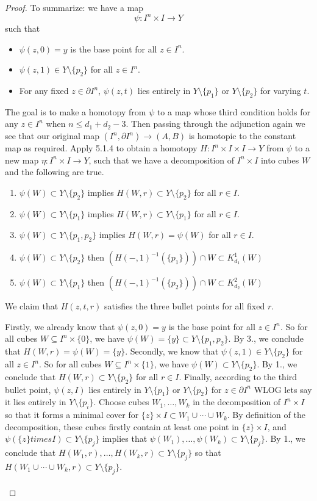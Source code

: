\documentclass[a4paper]{article}
\begin{document}
\begin{prp}{}{}
\begin{proof}
To summarize: we have a map $$\psi:I^n\times I\to Y$$ such that 
\begin{itemize}
\item $\psi(z,0)=y$ is the base point for all $z\in I^n$. 
\item $\psi(z,1)\in Y\setminus\{p_2\}$ for all $z\in I^n$. 
\item For any fixed $z\in\partial I^n$, $\psi(z,t)$ lies entirely in $Y\setminus\{p_1\}$ or $Y\setminus\{p_2\}$ for varying $t$. 
\end{itemize}
The goal is to make a homotopy from $\psi$ to a map whose third condition holds for any $z\in I^n$ when $n\leq d_1+d_2-3$. Then passing through the adjunction again we see that our original map $(I^n,\partial I^n)\to(A,B)$ is homotopic to the constant map as required. Apply 5.1.4 to obtain a homotopy $H:I^n\times I\times I\to Y$ from $\psi$ to a new map $\eta:I^n\times I\to Y$, such that we have a decomposition of $I^n\times I$ into cubes $W$ and the following are true. 
\begin{enumerate}
\item $\psi(W)\subset Y\setminus\{p_2\}$ implies $H(W,r)\subset Y\setminus\{p_2\}$ for all $r\in I$. 
\item $\psi(W)\subset Y\setminus\{p_1\}$ implies $H(W,r)\subset Y\setminus\{p_1\}$ for all $r\in I$. 
\item $\psi(W)\subset Y\setminus\{p_1,p_2\}$ implies $H(W,r)=\psi(W)$ for all $r\in I$. 
\item $\psi(W)\subset Y\setminus\{p_2\}$ then $(H(-,1)^{-1}(\{p_1\}))\cap W\subset K_{d_1}^1(W)$
\item $\psi(W)\subset Y\setminus\{p_1\}$ then $(H(-,1)^{-1}(\{p_2\}))\cap W\subset K_{d_2}^2(W)$
\end{enumerate}
We claim that $H(z,t,r)$ satisfies the three bullet points for all fixed $r$. 

Firstly, we already know that $\psi(z,0)=y$ is the base point for all $z\in I^n$. So for all cubes $W\subseteq I^n\times\{0\}$, we have $\psi(W)=\{y\}\subset Y\setminus\{p_1,p_2\}$. By 3., we conclude that $H(W,r)=\psi(W)=\{y\}$. Secondly, we know that $\psi(z,1)\in Y\setminus\{p_2\}$ for all $z\in I^n$. So for all cubes $W\subseteq I^n\times\{1\}$, we have $\psi(W)\subset Y\setminus\{p_2\}$. By 1., we conclude that $H(W,r)\subset Y\setminus\{p_2\}$ for all $r\in I$. Finally, according to the third bullet point, $\psi(z,I)$ lies entirely in $Y\setminus\{p_1\}$ or $Y\setminus\{p_2\}$ for $z\in\partial I^n$ WLOG lets say it lies entirely in $Y\setminus\{p_i\}$. Choose cubes $W_1,\dots,W_k$ in the decomposition of $I^n\times I$ so that it forms a minimal cover for $\{z\}\times I\subset W_1\cup\cdots\cup W_k$. By definition of the decomposition, these cubes firstly contain at least one point in $\{z\}\times I$, and $\psi(\{z\}times I)\subset Y\setminus\{p_j\}$ implies that $\psi(W_1),\dots,\psi(W_k)\subset Y\setminus\{p_j\}$. By 1., we conclude that $H(W_1,r),\dots,H(W_k,r)\subset Y\setminus\{p_j\}$ so that $H(W_1\cup\cdots\cup W_k,r)\subset Y\setminus\{p_j\}$. \\~\\


\end{proof}
\end{prp}
\end{document}
